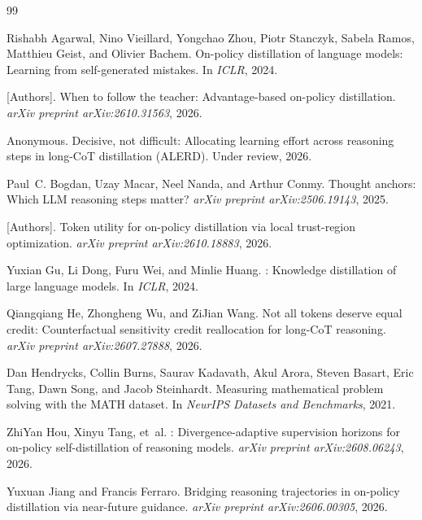 \documentclass[11pt]{article}
\theoremstyle{definition}
\theoremstyle{remark}
\newcommand{\todo}[1]{\textcolor{red!70!black}{[#1]}}
\begin{document}
\begin{thebibliography}{99}
\setlength{\itemsep}{2pt}
\small

Rishabh Agarwal, Nino Vieillard, Yongchao Zhou, Piotr Stanczyk, Sabela Ramos, Matthieu Geist, and Olivier Bachem.
\newblock On-policy distillation of language models: Learning from self-generated mistakes.
\newblock In \emph{ICLR}, 2024.

\todo{Authors}.
\newblock When to follow the teacher: Advantage-based on-policy distillation.
\newblock \emph{arXiv preprint arXiv:2610.31563}, 2026.

Anonymous.
\newblock Decisive, not difficult: Allocating learning effort across reasoning steps in long-{CoT} distillation (ALERD).
\newblock Under review, 2026.

Paul~C. Bogdan, Uzay Macar, Neel Nanda, and Arthur Conmy.
\newblock Thought anchors: Which {LLM} reasoning steps matter?
\newblock \emph{arXiv preprint arXiv:2506.19143}, 2025.

\todo{Authors}.
\newblock Token utility for on-policy distillation via local trust-region optimization.
\newblock \emph{arXiv preprint arXiv:2610.18883}, 2026.

Yuxian Gu, Li Dong, Furu Wei, and Minlie Huang.
: Knowledge distillation of large language models.
\newblock In \emph{ICLR}, 2024.

Qiangqiang He, Zhongheng Wu, and ZiJian Wang.
\newblock Not all tokens deserve equal credit: Counterfactual sensitivity credit reallocation for long-{CoT} reasoning.
\newblock \emph{arXiv preprint arXiv:2607.27888}, 2026.

Dan Hendrycks, Collin Burns, Saurav Kadavath, Akul Arora, Steven Basart, Eric Tang, Dawn Song, and Jacob Steinhardt.
\newblock Measuring mathematical problem solving with the {MATH} dataset.
\newblock In \emph{NeurIPS Datasets and Benchmarks}, 2021.

ZhiYan Hou, Xinyu Tang, et~al.
: Divergence-adaptive supervision horizons for on-policy self-distillation of reasoning models.
\newblock \emph{arXiv preprint arXiv:2608.06243}, 2026.

Yuxuan Jiang and Francis Ferraro.
\newblock Bridging reasoning trajectories in on-policy distillation via near-future guidance.
\newblock \emph{arXiv preprint arXiv:2606.00305}, 2026.


\end{thebibliography}
\end{document}
